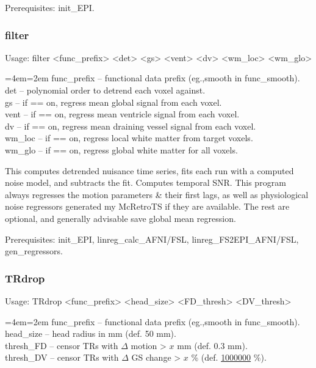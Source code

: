 \documentclass[final,titlepage,letterpaper,oneside,12pt]{article}
\renewcommand{\texttt}[2][BrickRed]{\textcolor{#1}{\ttfamily #2}}%
\newenvironment{blockquote}{%
  \par%
  \medskip
  \leftskip=4em\rightskip=2em%
  \noindent\ignorespaces}{%
  \par\medskip}
\begin{document}
Prerequisites: \texttt{init\_EPI}.

\subsubsection{filter}
Usage: \texttt{filter <func\_prefix> <det> <gs> <vent> <dv> <wm\_loc> <wm\_glo>}

\begin{blockquote}
func\_prefix -- functional data prefix (eg.,smooth in func\_smooth). \\
det -- polynomial order to detrend each voxel against. \\
gs -- if == on, regress mean global signal from each voxel. \\
vent -- if == on, regress mean ventricle signal from each voxel. \\
dv -- if == on, regress mean draining vessel signal from each voxel. \\
wm\_loc -- if == on, regress local white matter from target voxels. \\
wm\_glo -- if == on, regress global white matter for all voxels. \

\end{blockquote}

\noindent This computes detrended nuisance time series, fits each run with a computed noise model, and subtracts the fit. Computes temporal SNR. This program always regresses the motion parameters \& their first lags, as well as physiological noise regressors generated my McRetroTS if they are available. The rest are optional, and generally advisable save global mean regression.

Prerequisites: \texttt{init\_EPI}, \texttt{linreg\_calc\_AFNI/FSL}, \texttt{linreg\_FS2EPI\_AFNI/FSL}, \texttt{gen\_regressors}.

\subsubsection{TRdrop}
Usage: \texttt{TRdrop <func\_prefix> <head\_size> <FD\_thresh> <DV\_thresh>}

\begin{blockquote}
func\_prefix -- functional data prefix (eg.,smooth in func\_smooth). \\
head\_size -- head radius in mm (def. 50 mm). \\
thresh\_FD -- censor TRs with $\Delta$ motion > $x$ mm (def. 0.3 mm). \\
thresh\_DV -- censor TRs with $\Delta$ GS change > $x$ \% (def. \href{http://upload.wikimedia.org/wikipedia/en/1/16/Drevil_million_dollars.jpg}{1000000} \%). \
\end{blockquote}
\end{document}
